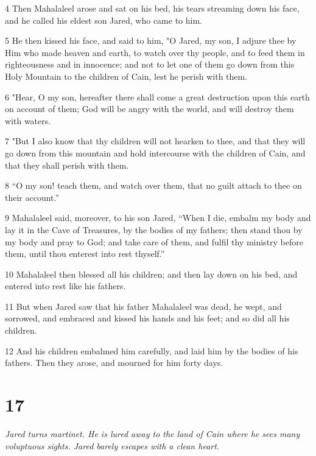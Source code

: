 \par 4 Then Mahalaleel arose and sat on his bed, his tears streaming down his face, and he called his eldest son Jared, who came to him.

\par 5 He then kissed his face, and said to him, "O Jared, my son, I adjure thee by Him who made heaven and earth, to watch over thy people, and to feed them in righteousness and in innocence; and not to let one of them go down from this Holy Mountain to the children of Cain, lest he perish with them.

\par 6 "Hear, O my son, hereafter there shall come a great destruction upon this earth on account of them; God will be angry with the world, and will destroy them with waters.

\par 7 "But I also know that thy children will not hearken to thee, and that they will go down from this mountain and hold intercourse with the children of Cain, and that they shall perish with them.

\par 8 “O my son! teach them, and watch over them, that no guilt attach to thee on their account.”

\par 9 Mahalaleel said, moreover, to his son Jared, “When I die, embalm my body and lay it in the Cave of Treasures, by the bodies of my fathers; then stand thou by my body and pray to God; and take care of them, and fulfil thy ministry before them, until thou enterest into rest thyself.”

\par 10 Mahalaleel then blessed all his children; and then lay down on his bed, and entered into rest like his fathers.

\par 11 But when Jared saw that his father Mahalaleel was dead, he wept, and sorrowed, and embraced and kissed his hands and his feet; and so did all his children.

\par 12 And his children embalmed him carefully, and laid him by the bodies of his fathers. Then they arose, and mourned for him forty days.

\chapter{17}

\par \textit{Jared turns martinet. He is lured away to the land of Cain where he sees many voluptuous sights. Jared barely escapes with a clean heart.}

